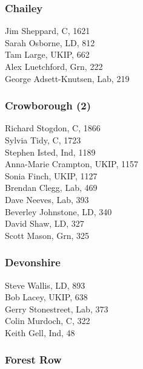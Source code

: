 \documentclass[a4paper,openany,10pt]{book}
\begin{document}
\subsubsection*{Chailey}



Jim Sheppard, C, 1621\\
Sarah Osborne, LD, 812\\
Tam Large, UKIP, 662\\
Alex Luetchford, Grn, 222\\
{George Adsett-Knutsen}, Lab, 219\\


\subsubsection*{Crowborough (2)}



Richard Stogdon, C, 1866\\
Sylvia Tidy, C, 1723\\
Stephen Isted, Ind, 1189\\
Anna-Marie Crampton, UKIP, 1157\\
Sonia Finch, UKIP, 1127\\
Brendan Clegg, Lab, 469\\
Dave Neeves, Lab, 393\\
Beverley Johnstone, LD, 340\\
David Shaw, LD, 327\\
Scott Mason, Grn, 325\\


\subsubsection*{Devonshire}



Steve Wallis, LD, 893\\
Bob Lacey, UKIP, 638\\
Gerry Stonestreet, Lab, 373\\
Colin Murdoch, C, 322\\
Keith Gell, Ind, 48\\


\subsubsection*{Forest Row}
\end{document}
